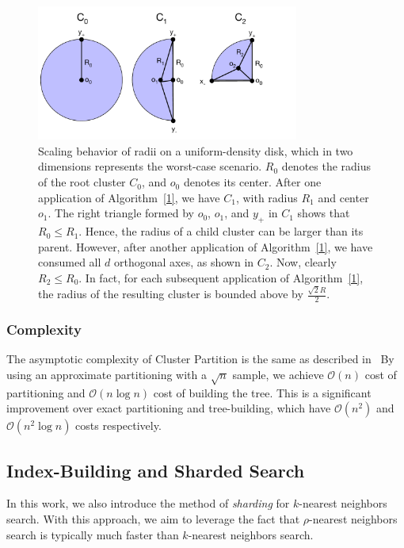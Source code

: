 \begin{figure}[ht!]
    \centering
    \includegraphics[width=3.4in]{images/geometry/geometry.pdf}
    \caption{Scaling behavior of radii on a uniform-density disk, which in two dimensions represents the worst-case scenario. 
    $R_0$ denotes the radius of the root cluster $C_0$, and $o_0$ denotes its center. 
    After one application of Algorithm~\ref{1}, we have $C_1$, with radius $R_1$ and center $o_1$.
    The right triangle formed by $o_0$, $o_1$, and $y_+$ in $C_1$ shows that $R_0 \leq R_1$.
    Hence, the radius of a child cluster can be larger than its parent. However, 
    after another application of Algorithm~\ref{1}, we have consumed all $d$ orthogonal axes, 
    as shown in $C_2$. 
    Now, clearly $R_2 \leq R_0$. In fact, for each subsequent application of Algorithm~\ref{1},
    the radius of the resulting cluster is bounded above by $\frac{\sqrt{2}R}{2}$.}
    \label{fig:methods:scaling_behavior}
\end{figure}

\subsubsection {Complexity}
\label{subsubsec:methods:clustering:complexity}

The asymptotic complexity of Cluster Partition is the same as described in~\cite{ishaq2019clustered}
By using an approximate partitioning with a $\sqrt{n}$ sample, we achieve $\mathcal{O}(n)$ cost of 
partitioning and $\mathcal{O}(n \log n)$ cost of building the tree. This is a significant improvement over 
exact partitioning and tree-building, which have $\mathcal{O}(n^2)$ and $\mathcal{O}(n^2 \log n)$ costs respectively.


\subsection {Index-Building and Sharded Search}
\label{subsec:methods:index-building}
In this work, we also introduce the method of \emph{sharding} for $k$-nearest neighbors search.
With this approach, we aim to leverage the fact that $\rho$-nearest neighbors search is typically 
much faster than $k$-nearest neighbors search. 


